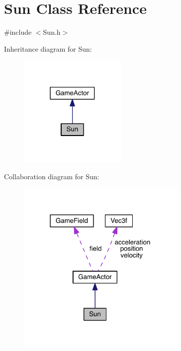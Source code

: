 \hypertarget{class_sun}{\section{Sun Class Reference}
\label{class_sun}
}


{\ttfamily \#include $<$Sun.\+h$>$}



Inheritance diagram for Sun\+:\nopagebreak
\begin{figure}[H]
\begin{center}
\leavevmode
\includegraphics[width=147pt]{class_sun__inherit__graph}
\end{center}
\end{figure}


Collaboration diagram for Sun\+:\nopagebreak
\begin{figure}[H]
\begin{center}
\leavevmode
\includegraphics[width=231pt]{class_sun__coll__graph}
\end{center}
\end{figure}
